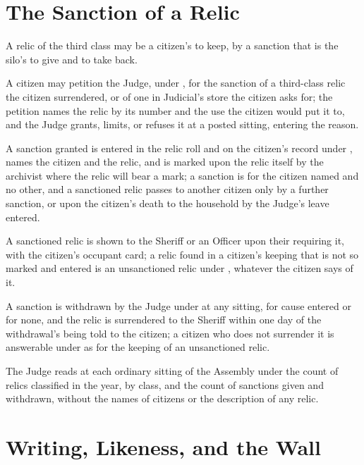 \section{The Sanction of a Relic}
\label{sec:publicorder:sanction-of-a-relic}

A relic of the third class may be a citizen's to keep, by a sanction that is the silo's to give and to take back.

\begin{clauses}
\item A citizen may petition the Judge, under , for the sanction of a third-class relic the citizen surrendered, or of one in Judicial's store the citizen asks for; the petition names the relic by its number and the use the citizen would put it to, and the Judge grants, limits, or refuses it at a posted sitting, entering the reason.
\item A sanction granted is entered in the relic roll and on the citizen's record under , names the citizen and the relic, and is marked upon the relic itself by the archivist where the relic will bear a mark; a sanction is for the citizen named and no other, and a sanctioned relic passes to another citizen only by a further sanction, or upon the citizen's death to the household by the Judge's leave entered.
\item A sanctioned relic is shown to the Sheriff or an Officer upon their requiring it, with the citizen's occupant card; a relic found in a citizen's keeping that is not so marked and entered is an unsanctioned relic under , whatever the citizen says of it.
\item A sanction is withdrawn by the Judge under  at any sitting, for cause entered or for none, and the relic is surrendered to the Sheriff within one day of the withdrawal's being told to the citizen; a citizen who does not surrender it is answerable under  as for the keeping of an unsanctioned relic.
\item The Judge reads at each ordinary sitting of the Assembly under  the count of relics classified in the year, by class, and the count of sanctions given and withdrawn, without the names of citizens or the description of any relic.
\end{clauses}

\section{Writing, Likeness, and the Wall}
\label{sec:publicorder:writing-likeness-and-the-wall}

